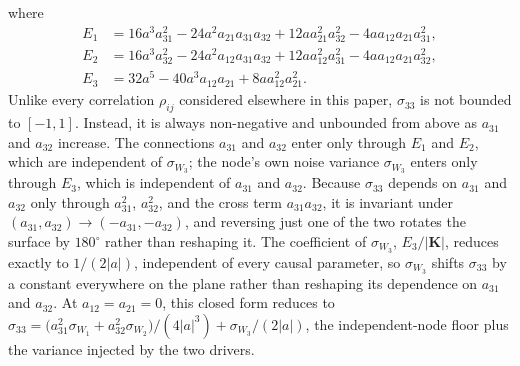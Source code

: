 \documentclass[12pt]{article}
\begin{document}
where
\begin{align}
E_{1} &= 16a^3a_{31}^2 - 24a^2a_{21}a_{31}a_{32}
        + 12aa_{21}^2a_{32}^2 - 4aa_{12}a_{21}a_{31}^2,
\label{eq:E1_coupled}\\
E_{2} &= 16a^3a_{32}^2 - 24a^2a_{12}a_{31}a_{32}
        + 12aa_{12}^2a_{31}^2 - 4aa_{12}a_{21}a_{32}^2,
\label{eq:E2_coupled}\\
E_{3} &= 32a^5 - 40a^3a_{12}a_{21} + 8aa_{12}^2a_{21}^2.
\label{eq:E3_coupled}
\end{align}
Unlike every correlation $\rho_{ij}$ considered elsewhere in this
paper, $\sigma_{33}$ is not bounded to $[-1,1]$. Instead, it is always non-negative and unbounded from above as $a_{31}$ and
$a_{32}$ increase.
The connections $a_{31}$ and $a_{32}$ enter only through $E_1$
and $E_2$, which are independent of $\sigma_{W_3}$; the node's
own noise variance $\sigma_{W_3}$ enters only through $E_3$,
which is independent of $a_{31}$ and $a_{32}$.
Because $\sigma_{33}$ depends on $a_{31}$ and $a_{32}$ only
through $a_{31}^2$, $a_{32}^2$, and the cross term
$a_{31}a_{32}$, it is invariant under
$(a_{31},a_{32})\to(-a_{31},-a_{32})$, and reversing just one
of the two rotates the surface by $180^\circ$ rather than
reshaping it.
The coefficient of $\sigma_{W_3}$, $E_3/|\mathbf{K}|$, reduces
exactly to $1/(2|a|)$, independent of every causal parameter,
so $\sigma_{W_3}$ shifts $\sigma_{33}$ by a constant everywhere
on the plane rather than reshaping its dependence on $a_{31}$
and $a_{32}$.
At $a_{12}=a_{21}=0$, this closed form reduces to
$\sigma_{33}=\bigl(a_{31}^2\sigma_{W_1}+a_{32}^2\sigma_{W_2}\bigr)/(4|a|^3)
+\sigma_{W_3}/(2|a|)$, the independent-node floor plus the
variance injected by the two drivers.
\end{document}

